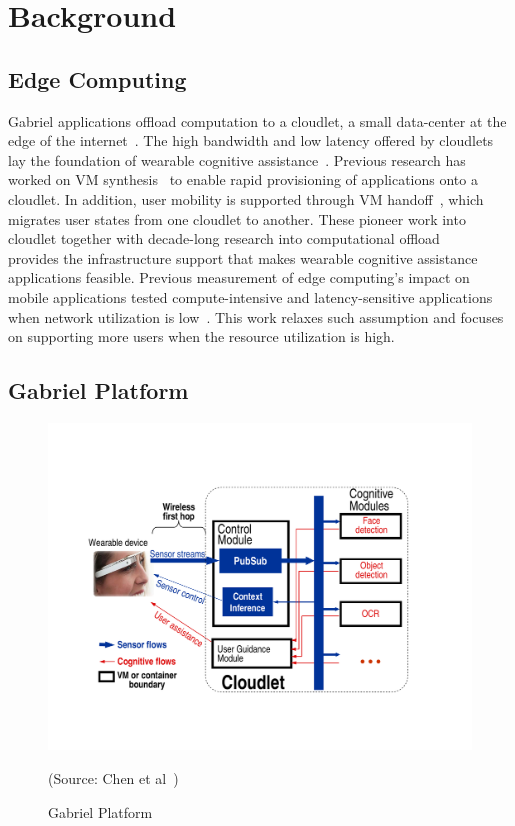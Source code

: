 \chapter{Background}
\label{chapter: background}

\section{Edge Computing}

Gabriel applications offload computation to a cloudlet, a small data-center at
the edge of the internet~\cite{satyanarayanan2009case}. The high bandwidth and
low latency offered by cloudlets~\cite{ha2013impact}~\cite{hu2016quantifying}
lay the foundation of wearable cognitive assistance~\cite{ha2014towards}.
Previous research has worked on VM synthesis~\cite{ha2013just} to enable rapid
provisioning of applications onto a cloudlet. In addition, user mobility is
supported through VM handoff~\cite{ha2017you}, which migrates user states from
one cloudlet to another. These pioneer work into cloudlet together with
decade-long research into computational
offload~\cite{cuervo2010maui}~\cite{gordon2012comet}~\cite{flinn2012cyber}
provides the infrastructure support that makes wearable cognitive assistance
applications feasible. Previous measurement of edge computing's impact on mobile
applications tested compute-intensive and latency-sensitive applications when
network utilization is low~\cite{chen2017empirical}. This work relaxes such assumption and
focuses on supporting more users when the resource utilization is high.


\section{Gabriel Platform}

\begin{figure}
\centering
\includegraphics[width=0.8\linewidth]{FIGS/fig-backend-structure-simple-crop.pdf}
\begin{captiontext}
{\rm (Source: Chen et al~\cite{chen2017empirical})}
\end{captiontext}
\caption{\small Gabriel Platform}
\label{fig:gabriel}
\end{figure}

